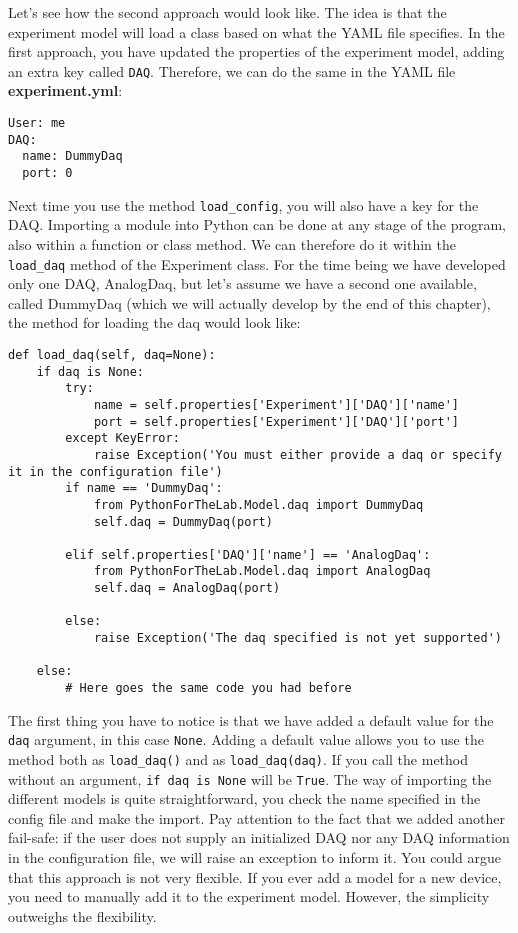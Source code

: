 Let's see how the second approach would look like. The idea is that the experiment model will load a class based on what the {YAML} file specifies. In the first approach, you have updated the properties of the
experiment model, adding an extra key called \texttt{DAQ}. Therefore, we can do the same in the {YAML} file \textbf{experiment.yml}:

\begin{verbatim}
User: me
DAQ:
  name: DummyDaq
  port: 0
\end{verbatim}

Next time you use the method \texttt{load_config}, you will also have a key for the {DAQ}. Importing a module into Python can be done at any stage of the program, also within a function or class method. We can therefore do it within the \texttt{load_daq} method of the Experiment class. For the time being we have developed only one DAQ, AnalogDaq, but let's assume we have a second one available, called DummyDaq (which we will actually develop by the end of this chapter), the method for loading the daq would look like:

\begin{verbatim}
def load_daq(self, daq=None):
    if daq is None:
        try:
            name = self.properties['Experiment']['DAQ']['name']
            port = self.properties['Experiment']['DAQ']['port']
        except KeyError:
            raise Exception('You must either provide a daq or specify it in the configuration file')
        if name == 'DummyDaq':
            from PythonForTheLab.Model.daq import DummyDaq
            self.daq = DummyDaq(port)
        
        elif self.properties['DAQ']['name'] == 'AnalogDaq':
            from PythonForTheLab.Model.daq import AnalogDaq
            self.daq = AnalogDaq(port)
        
        else:
            raise Exception('The daq specified is not yet supported')
    
    else:
        # Here goes the same code you had before
\end{verbatim}

The first thing you have to notice is that we have added a default value for the \texttt{daq} argument, in this case \texttt{None}. Adding a default value allows you to use the
method both as \texttt{load_daq()} and as \texttt{load_daq(daq)}. If you call the method without an argument, \texttt{if daq is None} will be \texttt{True}. The way of importing the different models is quite straightforward, you check the name specified in the config file and make the import. Pay attention to the fact that we added another fail-safe: if the user does not supply an initialized DAQ nor any DAQ information in the configuration file, we will raise an exception to inform it. You could argue that this approach is not very flexible. If you ever add a model for a new device, you need to manually add it to the experiment model. However, the simplicity outweighs the flexibility. 

